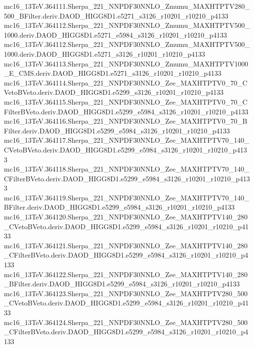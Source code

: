 \begin{scriptsize}
mc16\_13TeV.364111.Sherpa\_221\_NNPDF30NNLO\_Zmumu\_MAXHTPTV280\_500\_BFilter.deriv.DAOD\_HIGG8D1.e5271\_s3126\_r10201\_r10210\_p4133 \\
mc16\_13TeV.364112.Sherpa\_221\_NNPDF30NNLO\_Zmumu\_MAXHTPTV500\_1000.deriv.DAOD\_HIGG8D1.e5271\_e5984\_s3126\_r10201\_r10210\_p4133 \\
mc16\_13TeV.364112.Sherpa\_221\_NNPDF30NNLO\_Zmumu\_MAXHTPTV500\_1000.deriv.DAOD\_HIGG8D1.e5271\_s3126\_r10201\_r10210\_p4133 \\
mc16\_13TeV.364113.Sherpa\_221\_NNPDF30NNLO\_Zmumu\_MAXHTPTV1000\_E\_CMS.deriv.DAOD\_HIGG8D1.e5271\_s3126\_r10201\_r10210\_p4133 \\
mc16\_13TeV.364114.Sherpa\_221\_NNPDF30NNLO\_Zee\_MAXHTPTV0\_70\_CVetoBVeto.deriv.DAOD\_HIGG8D1.e5299\_s3126\_r10201\_r10210\_p4133 \\
mc16\_13TeV.364115.Sherpa\_221\_NNPDF30NNLO\_Zee\_MAXHTPTV0\_70\_CFilterBVeto.deriv.DAOD\_HIGG8D1.e5299\_e5984\_s3126\_r10201\_r10210\_p4133 \\
mc16\_13TeV.364116.Sherpa\_221\_NNPDF30NNLO\_Zee\_MAXHTPTV0\_70\_BFilter.deriv.DAOD\_HIGG8D1.e5299\_e5984\_s3126\_r10201\_r10210\_p4133 \\
mc16\_13TeV.364117.Sherpa\_221\_NNPDF30NNLO\_Zee\_MAXHTPTV70\_140\_CVetoBVeto.deriv.DAOD\_HIGG8D1.e5299\_e5984\_s3126\_r10201\_r10210\_p4133 \\
mc16\_13TeV.364118.Sherpa\_221\_NNPDF30NNLO\_Zee\_MAXHTPTV70\_140\_CFilterBVeto.deriv.DAOD\_HIGG8D1.e5299\_e5984\_s3126\_r10201\_r10210\_p4133 \\
mc16\_13TeV.364119.Sherpa\_221\_NNPDF30NNLO\_Zee\_MAXHTPTV70\_140\_BFilter.deriv.DAOD\_HIGG8D1.e5299\_e5984\_s3126\_r10201\_r10210\_p4133 \\
mc16\_13TeV.364120.Sherpa\_221\_NNPDF30NNLO\_Zee\_MAXHTPTV140\_280\_CVetoBVeto.deriv.DAOD\_HIGG8D1.e5299\_e5984\_s3126\_r10201\_r10210\_p4133 \\
mc16\_13TeV.364121.Sherpa\_221\_NNPDF30NNLO\_Zee\_MAXHTPTV140\_280\_CFilterBVeto.deriv.DAOD\_HIGG8D1.e5299\_e5984\_s3126\_r10201\_r10210\_p4133 \\
mc16\_13TeV.364122.Sherpa\_221\_NNPDF30NNLO\_Zee\_MAXHTPTV140\_280\_BFilter.deriv.DAOD\_HIGG8D1.e5299\_e5984\_s3126\_r10201\_r10210\_p4133 \\
mc16\_13TeV.364123.Sherpa\_221\_NNPDF30NNLO\_Zee\_MAXHTPTV280\_500\_CVetoBVeto.deriv.DAOD\_HIGG8D1.e5299\_e5984\_s3126\_r10201\_r10210\_p4133 \\
mc16\_13TeV.364124.Sherpa\_221\_NNPDF30NNLO\_Zee\_MAXHTPTV280\_500\_CFilterBVeto.deriv.DAOD\_HIGG8D1.e5299\_e5984\_s3126\_r10201\_r10210\_p4133 \\

\end{scriptsize}
